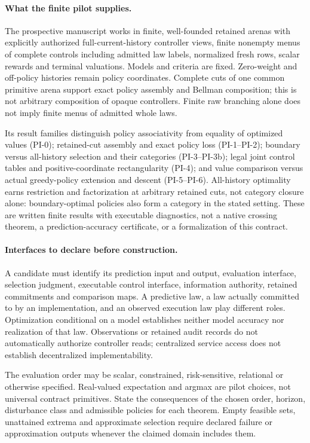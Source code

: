 \documentclass[11pt]{article}
\begin{document}
\paragraph{What the finite pilot supplies.}
The prospective manuscript \cite{pilot} works in finite, well-founded retained arenas with explicitly authorized full-current-history controller views, finite nonempty menus of complete controls including admitted law labels, normalized fresh rows, scalar rewards and terminal valuations. Models and criteria are fixed. Zero-weight and off-policy histories remain policy coordinates. Complete cuts of one common primitive arena support exact policy assembly and Bellman composition; this is not arbitrary composition of opaque controllers. Finite raw branching alone does not imply finite menus of admitted whole laws.

Its result families distinguish policy associativity from equality of optimized values (PI-0); retained-cut assembly and exact policy loss (PI-1--PI-2); boundary versus all-history selection and their categories (PI-3--PI-3b); legal joint control tables and positive-coordinate rectangularity (PI-4); and value comparison versus actual greedy-policy extension and descent (PI-5--PI-6). All-history optimality earns restriction and factorization at arbitrary retained cuts, not category closure alone: boundary-optimal policies also form a category in the stated setting. These are written finite results with executable diagnostics, not a native crossing theorem, a prediction-accuracy certificate, or a formalization of this contract.

\paragraph{Interfaces to declare before construction.}
A candidate must identify its prediction input and output, evaluation interface, selection judgment, executable control interface, information authority, retained commitments and comparison maps. A predictive law, a law actually committed to by an implementation, and an observed execution law play different roles. Optimization conditional on a model establishes neither model accuracy nor realization of that law. Observations or retained audit records do not automatically authorize controller reads; centralized service access does not establish decentralized implementability.

The evaluation order may be scalar, constrained, risk-sensitive, relational or otherwise specified. Real-valued expectation and argmax are pilot choices, not universal contract primitives. State the consequences of the chosen order, horizon, disturbance class and admissible policies for each theorem. Empty feasible sets, unattained extrema and approximate selection require declared failure or approximation outputs whenever the claimed domain includes them.
\end{document}
